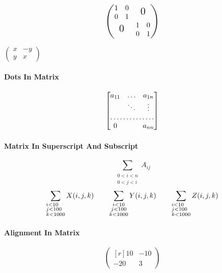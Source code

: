 \[
    \begin{pmatrix}
        \begin{matrix} 1 & 0 \\ 0 & 1 \end{matrix} & \text{\Large 0} \\
        \text{\Large 0} & \begin{matrix} 1 & 0 \\ 0 & 1 \end{matrix}
    \end{pmatrix}
\]

$ \left(
    \begin{smallmatrix}
        x & -y \\ y & x
    \end{smallmatrix}
\right) $

\paragraph{Dots In Matrix}
\[
    \begin{bmatrix}
        a_{11} & \dots  & a_{1n} \\
               & \ddots & \vdots \\
        \hdotsfor{3}             \\
        0      &        & a_{nn}
    \end{bmatrix}
\]

\paragraph{Matrix In Superscript And Subscript}
\[
    \sum_{\substack{0<i<n \\ 0<j<i}} A_{ij}
\]
\[
    \sum_{\begin{subarray}{l} i<10 \\ j<100 \\ k<1000 \end{subarray}} X(i, j, k) \qquad
    \sum_{\begin{subarray}{c} i<10 \\ j<100 \\ k<1000 \end{subarray}} Y(i, j, k) \qquad
    \sum_{\begin{subarray}{r} i<10 \\ j<100 \\ k<1000 \end{subarray}} Z(i, j, k)
\]

\paragraph{Alignment In Matrix}
\[
    \begin{pmatrix*}[r]
        10 & -10 \\ -20 & 3
    \end{pmatrix*}
\]

